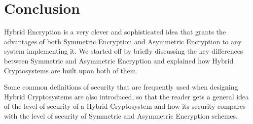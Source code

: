 \section{Conclusion}

\label{sec:conclusion}

Hybrid Encryption is a very clever and sophisticated idea that grants the advantages of both Symmetric Encryption and Asymmetric Encryption to any system implementing it. We started off by briefly discussing the key differences between Symmetric and Asymmetric Encryption and explained how Hybrid Cryptosystems are built upon both of them.

Some common definitions of security that are frequently used when designing Hybrid Cryptosystems are also introduced, so that the reader gets a general idea of the level of security of a Hybrid Cryptosystem and how its security compares with the level of security  of Symmetric and Asymmetric Encryption schemes.\\

